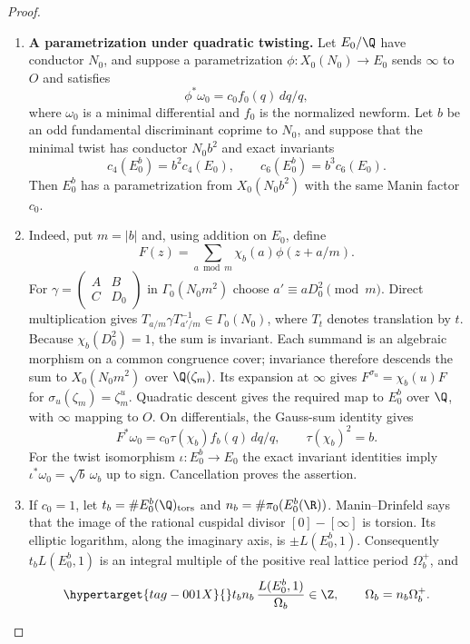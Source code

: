 \begin{proof}
\begin{enumerate}[label=\arabic*.,leftmargin=*]
\item \textbf{A parametrization under quadratic twisting.}
Let $E_0/\Q$ have conductor $N_0$, and suppose a parametrization
$\phi:X_0(N_0)\to E_0$ sends $\infty$ to $O$ and satisfies
\[
 \phi^*\omega_0=c_0f_0(q)\,dq/q,
\]
where $\omega_0$ is a minimal differential and $f_0$ is the normalized
newform. Let $b$ be an odd fundamental discriminant coprime to $N_0$,
and suppose that the minimal twist has conductor $N_0b^2$ and exact
invariants
\[
 c_4(E_0^b)=b^2c_4(E_0),\qquad
 c_6(E_0^b)=b^3c_6(E_0).
\]
Then $E_0^b$ has a parametrization from $X_0(N_0b^2)$ with the same
Manin factor $c_0$.

\item Indeed, put $m=|b|$ and, using addition on $E_0$, define
\[
 F(z)=\sum_{a\bmod m}\chi_b(a)\phi(z+a/m).
\]
For $\gamma=\left(\begin{smallmatrix}A&B\\C&D_0\end{smallmatrix}\right)$
in $\Gamma_0(N_0m^2)$ choose $a'\equiv aD_0^2\pmod m$.
Direct multiplication gives
$T_{a/m}\gamma T_{a'/m}^{-1}\in\Gamma_0(N_0)$, where $T_t$
denotes translation by $t$. Because $\chi_b(D_0^2)=1$, the sum is
invariant. Each summand is an algebraic morphism on a common
congruence cover; invariance therefore descends the sum to
$X_0(N_0m^2)$ over $\Q(\zeta_m)$. Its expansion at $\infty$
gives $F^{\sigma_u}=\chi_b(u)F$ for
$\sigma_u(\zeta_m)=\zeta_m^u$. Quadratic descent gives the required
map to $E_0^b$ over $\Q$, with $\infty$ mapping to $O$.
On differentials, the Gauss-sum identity gives
\[
 F^*\omega_0=c_0\tau(\chi_b)f_b(q)\,dq/q,
 \qquad \tau(\chi_b)^2=b.
\]
For the twist isomorphism $\iota:E_0^b\to E_0$ the exact invariant
identities imply
$\iota^*\omega_0=\sqrt b\,\omega_b$ up to sign. Cancellation proves the assertion.

\item If $c_0=1$, let $t_b=\#E_0^b(\Q)_{\rm tors}$ and
$n_b=\#\pi_0(E_0^b(\R))$. Manin--Drinfeld \citep[Section~1, unnumbered theorem, p.~83 of the Russian original]{Drinfeld1973} says that the image of
the rational cuspidal divisor $[0]-[\infty]$ is torsion. Its elliptic
logarithm, along the imaginary axis, is $\pm L(E_0^b,1)$.
Consequently $t_bL(E_0^b,1)$ is an integral multiple of the positive
real lattice period $\Omega_b^+$, and
\begin{equation}\hypertarget{tag-001X}{}\label{ari:eq:Cgz-central-integrality}
 t_bn_b\,\frac{L(E_0^b,1)}{\Omega_b}\in\Z,
 \qquad \Omega_b=n_b\Omega_b^+.
\end{equation}


\end{enumerate}
\end{proof}
